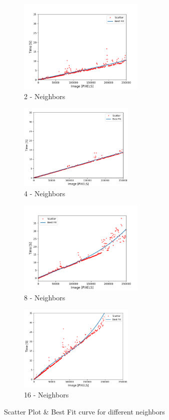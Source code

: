 \documentclass{article}
\begin{document}
\begin{figure}[H]
  \begin{subfigure}{6cm}
    \centering\includegraphics[width=6cm]{tests/test_ws_2.png}
    \caption{2 - Neighbors}
  \end{subfigure}
  \begin{subfigure}{6cm}
    \centering\includegraphics[width=5.5cm]{tests/test_ws_4.png}
    \caption{4 - Neighbors}
  \end{subfigure}
 
  \begin{subfigure}{6cm}
    \centering\includegraphics[width=6cm]{tests/test_ws_8.png}
    \caption{8 - Neighbors}
  \end{subfigure}
  \begin{subfigure}{6cm}
    \centering\includegraphics[width=5.5cm]{tests/test_ws_16.png}
    \caption{16 - Neighbors}
  \end{subfigure}
  \caption{Scatter Plot \& Best Fit curve for different neighbors}
  \label{fig:neighbor-test}
\end{figure}
\end{document}
